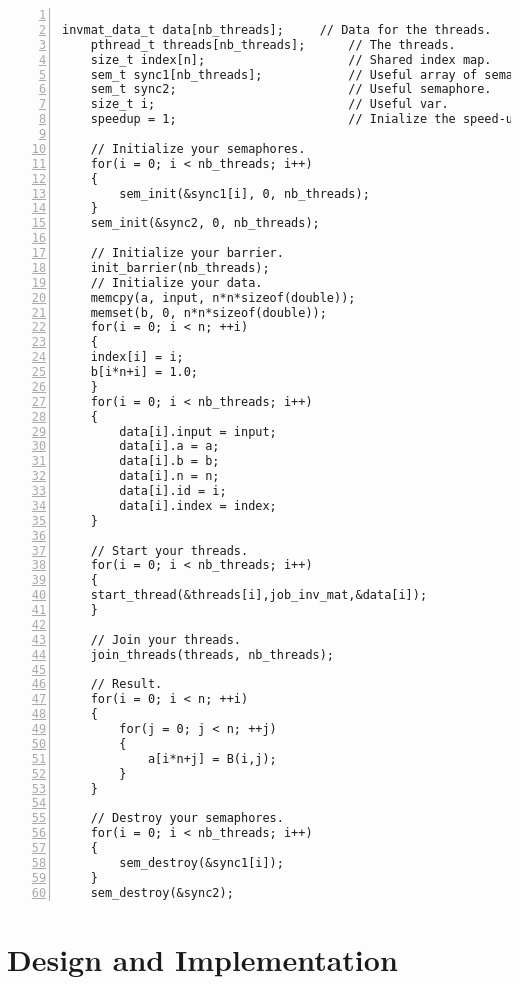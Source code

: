 \documentclass{article}
\begin{document}
\begin{lstlisting}[basicstyle=\small\sffamily,
keywords={break,case,const,continue,default,else,enum,
for,if,return,switch,while,do,long,void,int,float,double,
char,struct,typedef,include,size\_t},
keywordstyle={\color{blue}},
comment={[l]{//}}, morecomment={[s]{/*}{*/}}, commentstyle=\itshape,
columns={[l]flexible}, numbers=left, numberstyle=\tiny,
frameround=fftt, frame=shadowbox, captionpos=b,
caption={Function \texttt{pthread\_inv\_mat}.},
label=LST:pinvmat]

invmat_data_t data[nb_threads];     // Data for the threads.
    pthread_t threads[nb_threads];      // The threads.
    size_t index[n];                    // Shared index map.
    sem_t sync1[nb_threads];            // Useful array of semaphores.
    sem_t sync2;                        // Useful semaphore.
    size_t i;                           // Useful var.
    speedup = 1;                        // Inialize the speed-up evaluation.

    // Initialize your semaphores.
	for(i = 0; i < nb_threads; i++)
	{
		sem_init(&sync1[i], 0, nb_threads);
	}
	sem_init(&sync2, 0, nb_threads);
	
    // Initialize your barrier.
	init_barrier(nb_threads);
    // Initialize your data.
	memcpy(a, input, n*n*sizeof(double));
	memset(b, 0, n*n*sizeof(double));
	for(i = 0; i < n; ++i)
	{
	index[i] = i;
	b[i*n+i] = 1.0;
	}
	for(i = 0; i < nb_threads; i++)
    {
		data[i].input = input;
        data[i].a = a;
        data[i].b = b;
        data[i].n = n;
        data[i].id = i;
		data[i].index = index;
    }
	
    // Start your threads.
	for(i = 0; i < nb_threads; i++)
    {
    start_thread(&threads[i],job_inv_mat,&data[i]);
    }
	
    // Join your threads.
	join_threads(threads, nb_threads);
	
	// Result.
    for(i = 0; i < n; ++i)
    {
        for(j = 0; j < n; ++j)
        {
            a[i*n+j] = B(i,j);
        }
    }
	
    // Destroy your semaphores.
	for(i = 0; i < nb_threads; i++)
	{
		sem_destroy(&sync1[i]);
	}
	sem_destroy(&sync2);
\end{lstlisting}


\section{Design and Implementation}
\end{document}
